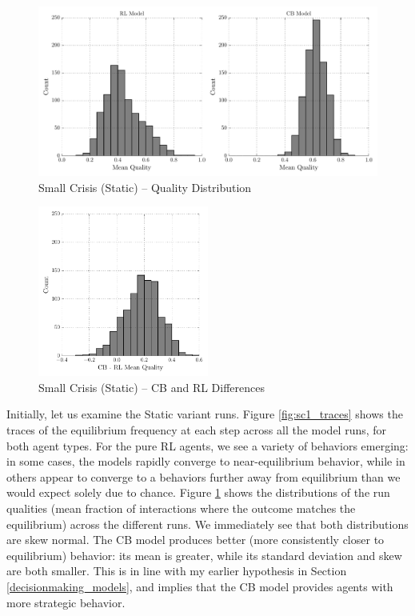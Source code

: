 \begin{figure}[h!]
	\includegraphics[width=\textwidth]{WarReason/Figures/SC_1_histograms}
    \caption{Small Crisis (Static) -- Quality Distribution}
    \label{fig:sc1_outcomes}
    \figSpace
\end{figure}

\begin{figure}[h!]
	\includegraphics[width=0.5\textwidth]{WarReason/Figures/SC_1_deltas}
    \caption{Small Crisis (Static) -- CB and RL Differences}
    \label{fig:sc1_deltas}
    \figSpace
\end{figure}


Initially, let us examine the Static variant runs. Figure \ref{fig:sc1_traces} shows the traces of the equilibrium frequency at each step across all the model runs, for both agent types. For the pure RL agents, we see a variety of behaviors emerging: in some cases, the models rapidly converge to near-equilibrium behavior, while in others appear to converge to a behaviors further away from equilibrium than we would expect solely due to chance. Figure \ref{fig:sc1_outcomes} shows the distributions of the run qualities (mean fraction of interactions where the outcome matches the equilibrium) across the different runs. We immediately see that both distributions are skew normal. The CB model produces better (more consistently closer to equilibrium) behavior: its mean is greater, while its standard deviation and skew are both smaller. This is in line with my earlier hypothesis in Section \ref{decisionmaking_models}, and implies that the CB model provides agents with more strategic behavior.


